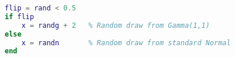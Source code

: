 
\begin{lstlisting}[language=Matlab]
flip = rand < 0.5
if flip
    x = randg + 2   % Random draw from Gamma(1,1)
else
    x = randn       % Random draw from standard Normal
end
\end{lstlisting}
